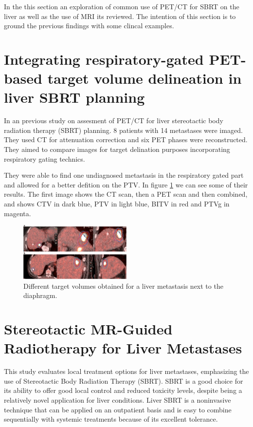 
\label{sec:case2}


In the this section an exploration of common use of PET/CT for SBRT on the liver as well as the use of MRI its reviewed. The intention of this section is to ground the previous findings with some clincal examples.

\section*{Integrating respiratory-gated PET-based target volume delineation in liver SBRT planning}

In an previous study on assesment of PET/CT for liver stereotactic body radiation therapy (SBRT) planning. 8 patients with 14 metastases were imaged. They used CT for attenuation correction and six PET phases were reconstructed. They aimed to compare images for target delination purposes incorporating respiratory gating technics. \cite{Riou2014}

They were able to find one undiagnosed metastasis in the respiratory gated part and allowed for a better defition on the PTV. In figure \ref{fig:liver-metastasis-PET} we can see some of their results. The first image shows the CT scan, then a PET scan and then combined, and shows CTV in dark blue, PTV in light blue, BITV in red and PTVg in magenta. 

\begin{figure}[H]
	\centering
	\includegraphics[width=0.5\textwidth]{assets/PETSBRTcomplete.png}
	\caption{Different target volumes obtained for a liver metastasis next to the diaphragm.\cite{Riou2014}}
	\label{fig:liver-metastasis-PET}
\end{figure}


\section*{Stereotactic MR-Guided Radiotherapy for Liver Metastases}

This study evaluates local treatment options for liver metastases, emphasizing the use of Stereotactic Body Radiation Therapy (SBRT). SBRT is a good choice for its ability to offer good local control and reduced toxicity levels, despite being a relatively novel application for liver conditions. Liver SBRT is a noninvasive technique that can be applied on an outpatient basis and is easy to combine sequentially with systemic treatments because of its excellent tolerance.

